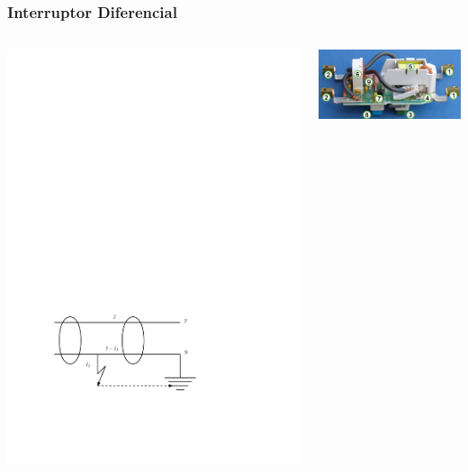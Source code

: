 \documentclass[serif, xcolor=dvipsnames]{beamer}
\begin{document}
\begin{frame}
  \frametitle{Interruptor Diferencial}
  \begin{columns}[c]%


    \column{4cm}


    \begin{center}
      \includegraphics[scale=0.45]{../figs/InterruptorDiferencial}
      \par\end{center}


    \column{4cm}


    \begin{center}
      \includegraphics[scale=0.4]{../figs/ResidualCurrentCircuitBreak}
      \par\end{center}

  \end{columns}%

\end{frame}
\end{document}
